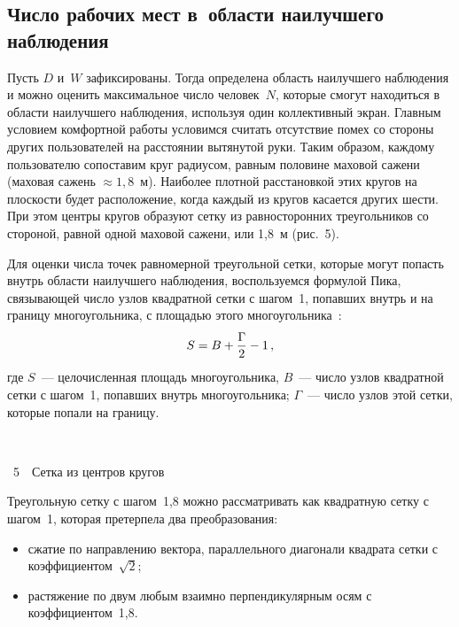 \begin{multicols}{2}
\subsection{Число рабочих мест в~области наилучшего наблюдения} %

Пусть $D$ и~$W$ зафиксированы. Тогда определена область наилучшего 
наблюдения и можно оценить максимальное число человек~$N$, которые 
смогут находиться в области наилучшего наблюдения, используя один 
коллективный экран. Главным условием комфортной работы условимся 
считать отсутствие помех со стороны других пользователей на расстоянии 
вытянутой руки. Таким образом, каждому пользователю сопоставим круг 
радиусом, равным половине маховой сажени (маховая сажень $\approx 
1{,}8$~м). Наиболее плотной расстановкой этих кругов на плоскости будет 
расположение, когда каж\-дый из кругов касается других шести. При этом 
центры кругов образуют сетку из равносторонних треугольников со 
стороной, равной одной маховой сажени, или 1,8~м (рис.~5).


Для оценки числа точек равномерной треугольной сетки, которые могут 
попасть внутрь области
 наилучшего наблюдения, воспользуемся формулой
Пика, связывающей число узлов квадратной сетки
 с шагом~1, попавших 
внутрь и на границу многоугольника, с площадью этого 
многоугольника~\cite{17chu}:
\begin{equation*}
S=B+\displaystyle\frac{\displaystyle \Gamma\mathstrut}{\displaystyle 2\mathstrut}-1\,,
\end{equation*}
где $S$~--- целочисленная площадь многоугольника, $B$~--- число узлов 
квадратной сетки с шагом~1, попавших внутрь многоугольника; 
$\Gamma$~--- число узлов этой сетки, которые попали на границу.
\begin{center} %
\mbox{%
\epsfxsize=73.141mm
}
\end{center}
\vspace*{4pt}
\begin{center}
{{\figurename~5}\ \ \small{Сетка из центров кругов}}
\end{center}

\addtocounter{figure}{1}



Треугольную сетку с шагом~1,8 можно рас\-смат\-ри\-вать как квадратную сетку 
с шагом~1, которая претерпела два преобразования:
\begin{itemize}
\item сжатие по направлению вектора, параллельного диагонали квадрата 
сетки с коэффициентом~$\sqrt{2}$;
\item растяжение по двум любым взаимно перпендикулярным осям с 
коэффициентом~1,8.
\end{itemize}


\end{multicols}
